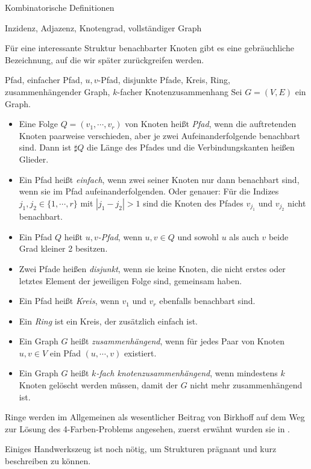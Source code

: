 \begin{section}{Kombinatorische Definitionen}
\begin{definition}{Inzidenz, Adjazenz, Knotengrad, vollständiger Graph}
\begin{itemize}
   \end{itemize}
  \end{definition}
    
  Für eine interessante Struktur benachbarter Knoten gibt es eine gebräuchliche Bezeichnung, auf die wir später zurückgreifen werden.
  
  \begin{definition}{Pfad, einfacher Pfad, $u,v$-Pfad, disjunkte Pfade, Kreis, Ring, zusammenhängender Graph, $k$-facher Knotenzusammenhang}
  Sei $G=(V,E)$ ein Graph.
   \begin{itemize}
    \item Eine Folge $Q = (v_1,\cdots,v_r)$ von Knoten heißt \textit{Pfad}, wenn die auftretenden Knoten paarweise verschieden, aber je zwei Aufeinanderfolgende benachbart sind. Dann ist $\sharp Q$ die Länge des Pfades und die Verbindungskanten heißen Glieder.
    \item Ein Pfad heißt \textit{einfach}, wenn zwei seiner Knoten nur dann benachbart sind, wenn sie im Pfad aufeinanderfolgenden. Oder genauer: Für die Indizes $j_1, j_2 \in \{1,\cdots,r\}$ mit $|j_1 - j_2| > 1$ sind die Knoten des Pfades $v_{j_1}$ und $v_{j_2}$ nicht benachbart.
    \item Ein Pfad $Q$ heißt \textit{$u,v$-Pfad}, wenn $u,v \in Q$ und sowohl $u$ als auch $v$ beide Grad kleiner 2 besitzen.
    \item Zwei Pfade heißen \textit{disjunkt}, wenn sie keine Knoten, die nicht erstes oder letztes Element der jeweiligen Folge sind, gemeinsam haben. 
    \item Ein Pfad heißt \textit{Kreis}, wenn $v_1$ und $v_r$ ebenfalls benachbart sind.
    \item Ein \textit{Ring} ist ein Kreis, der zusätzlich einfach ist.
    \item Ein Graph $G$ heißt \textit{zusammenhängend}, wenn für jedes Paar von Knoten $u,v \in V$ ein Pfad $(u,\cdots,v)$ existiert.
    \item Ein Graph $G$ heißt \textit{$k$-fach knotenzusammenhängend}, wenn mindestens $k$ Knoten gelöscht werden müssen, damit der $G$ nicht mehr zusammenhängend ist.
   \end{itemize}
  \end{definition}
  
  Ringe werden im Allgemeinen als wesentlicher Beitrag von Birkhoff auf dem Weg zur Lösung des 4-Farben-Problems angesehen, zuerst erwähnt wurden sie in \cite{AmJMath35}.

  Einiges Handwerkszeug ist noch nötig, um Strukturen prägnant und kurz beschreiben zu können.
  

\end{section}
